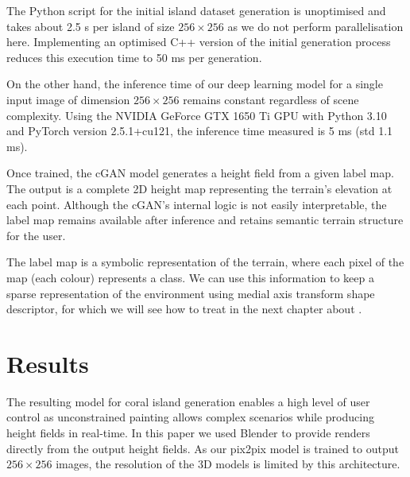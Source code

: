 The Python script for the initial island dataset generation is unoptimised and takes about 2.5 s per island of size $256 \times 256$ as we do not perform parallelisation here. Implementing an optimised C++ version of the initial generation process reduces this execution time to 50 ms per generation.

On the other hand, the inference time of our deep learning model for a single input image of dimension $256 \times 256$ remains constant regardless of scene complexity. Using the NVIDIA GeForce GTX 1650 Ti GPU with Python 3.10 and PyTorch version 2.5.1+cu121, the inference time measured is 5 ms (std 1.1 ms).

Once trained, the cGAN model generates a height field from a given label map. The output is a complete 2D height map representing the terrain's elevation at each point. Although the cGAN's internal logic is not easily interpretable, the label map remains available after inference and retains semantic terrain structure for the user.

The label map is a symbolic representation of the terrain, where each pixel of the map (each colour) represents a class. We can use this information to keep a sparse representation of the environment using medial axis transform shape descriptor, for which we will see how to treat in the next chapter about .


\section{Results}
\label{sec:coral-island-results}

The resulting model for coral island generation enables a high level of user control as unconstrained painting allows complex scenarios while producing height fields in real-time. In this paper we used Blender to provide renders directly from the output height fields. As our pix2pix model is trained to output $256\times256$ images, the resolution of the 3D models is limited by this architecture.

